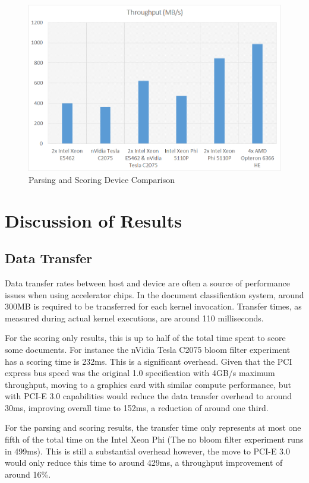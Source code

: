 \begin{figure}[H]
\centering
\includegraphics[width=\linewidth]{images/parsingScoringBest.png}
\caption{Parsing and Scoring Device Comparison}
\label{fig:parseScoringBest}
\end{figure}

\section{Discussion of Results}

\subsection{Data Transfer}

Data transfer rates between host and device are often a source of performance
issues when using accelerator chips. In the document classification system,
around 300MB is required to be transferred for each kernel invocation. Transfer
times, as measured during actual kernel executions, are around 110 milliseconds.

For the scoring only results, this is up to half of the total time spent to
score some documents. For instance the nVidia Tesla C2075 bloom filter
experiment has a scoring time is 232ms. This is a significant overhead. Given
that the PCI express bus speed was the original 1.0 specification with 4GB/s
maximum throughput, moving to a graphics card with similar compute performance,
but with PCI-E 3.0 capabilities would reduce the data transfer overhead to
around 30ms, improving overall time to 152ms, a reduction of around one third.

For the parsing and scoring results, the transfer time only represents at most
one fifth of the total time on the Intel Xeon Phi (The no bloom filter
experiment runs in 499ms). This is still a substantial overhead however, the
move to PCI-E 3.0 would only reduce this time to around 429ms, a throughput
improvement of around 16\%.

